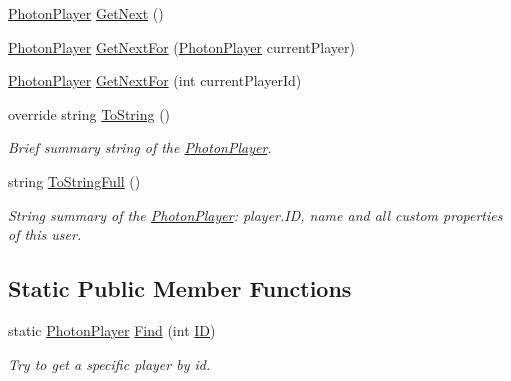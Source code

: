 \begin{DoxyCompactItemize}
\item 
\hyperlink{class_photon_player}{Photon\+Player} \hyperlink{class_photon_player_a4c7bf5d0bf28c15b67929a8a5297b96e}{Get\+Next} ()
\item 
\hyperlink{class_photon_player}{Photon\+Player} \hyperlink{class_photon_player_a2cc6f30dc2691bc700b0a11bdaffcffd}{Get\+Next\+For} (\hyperlink{class_photon_player}{Photon\+Player} current\+Player)
\item 
\hyperlink{class_photon_player}{Photon\+Player} \hyperlink{class_photon_player_adb4677870c9c5903527ce75dc0edba2b}{Get\+Next\+For} (int current\+Player\+Id)
\item 
override string \hyperlink{class_photon_player_a0f41b47ae95448d2e6f7a4394c54f359}{To\+String} ()
\begin{DoxyCompactList}\small\item\em Brief summary string of the \hyperlink{class_photon_player}{Photon\+Player}. \end{DoxyCompactList}\item 
string \hyperlink{class_photon_player_af03034498d0b8bedf022decd6a570d70}{To\+String\+Full} ()
\begin{DoxyCompactList}\small\item\em String summary of the \hyperlink{class_photon_player}{Photon\+Player}\+: player.\+ID, name and all custom properties of this user. \end{DoxyCompactList}\end{DoxyCompactItemize}
\subsection*{Static Public Member Functions}
\begin{DoxyCompactItemize}
\item 
static \hyperlink{class_photon_player}{Photon\+Player} \hyperlink{class_photon_player_a32462ded2866ee76839b59bd2cb3cd8c}{Find} (int \hyperlink{class_photon_player_ac363d86e7c6ea63573e0ecfda7f7eaa7}{ID})
\begin{DoxyCompactList}\small\item\em Try to get a specific player by id. \end{DoxyCompactList}\end{DoxyCompactItemize}
